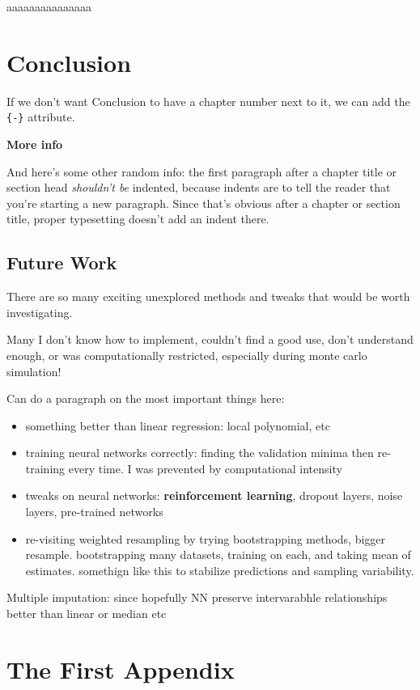 \documentclass[12pt,twoside]{reedthesis}
\providecommand{\tightlist}{%
  \setlength{\itemsep}{0pt}\setlength{\parskip}{0pt}}
\begin{document}
aaaaaaaaaaaaaaa

\chapter*{Conclusion}\label{conclusion}

If we don't want Conclusion to have a chapter number next to it, we can
add the \texttt{\{-\}} attribute.

\textbf{More info}

And here's some other random info: the first paragraph after a chapter
title or section head \emph{shouldn't be} indented, because indents are
to tell the reader that you're starting a new paragraph. Since that's
obvious after a chapter or section title, proper typesetting doesn't add
an indent there.

\section{Future Work}\label{future-work}

There are so many exciting unexplored methods and tweaks that would be
worth investigating.

Many I don't know how to implement, couldn't find a good use, don't
understand enough, or was computationally restricted, especially during
monte carlo simulation!

Can do a paragraph on the most important things here:
\begin{itemize}
\tightlist
\item
  something better than linear regression: local polynomial, etc
\item
  training neural networks correctly: finding the validation minima then
  re-training every time. I was prevented by computational intensity
\item
  tweaks on neural networks: \textbf{reinforcement learning}, dropout
  layers, noise layers, pre-trained networks
\item
  re-visiting weighted resampling by trying bootstrapping methods,
  bigger resample. bootstrapping many datasets, training on each, and
  taking mean of estimates. somethign like this to stabilize predictions
  and sampling variability.
\end{itemize}
Multiple imputation: since hopefully NN preserve intervarabhle
relationships better than linear or median etc

\appendix

\chapter{The First Appendix}\label{the-first-appendix}
\end{document}
